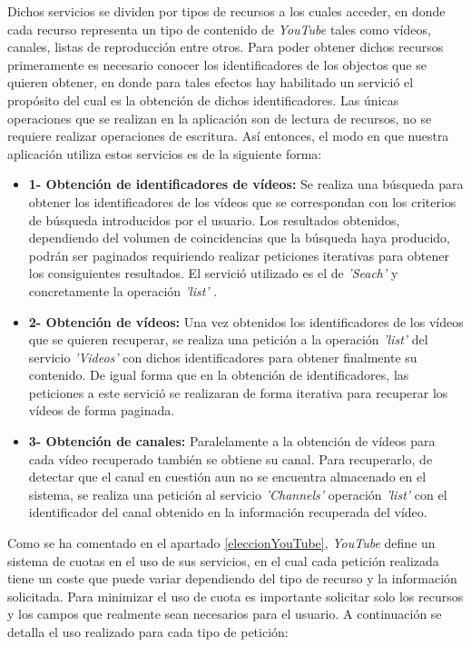 \documentclass[11pt,a4paper]{article}
\begin{document}
Dichos servicios se dividen por tipos de recursos a los cuales acceder, en donde cada recurso representa un tipo de contenido de \textit{YouTube} tales como vídeos, canales, listas de reproducción entre otros. Para poder obtener dichos recursos primeramente es necesario conocer los identificadores de los objectos que se quieren obtener, en donde para tales efectos hay habilitado un servició el propósito del cual es la obtención de dichos identificadores. Las únicas operaciones que se realizan en la aplicación son de lectura de recursos, no se requiere realizar operaciones de escritura. Así entonces, el modo en que nuestra aplicación utiliza estos servicios es de la siguiente forma:
\\
\begin{itemize}
\item \textbf{1- Obtención de identificadores de vídeos:} Se realiza una búsqueda para obtener los identificadores de los vídeos que se correspondan con los criterios de búsqueda introducidos por el usuario. Los resultados obtenidos, dependiendo del volumen de coincidencias que la búsqueda haya producido, podrán ser paginados requiriendo realizar peticiones iterativas para obtener los consiguientes resultados. El servició utilizado es el de \textit{'Seach'} y concretamente la operación \textit{'list'} \cite{30}.
\item \textbf{2- Obtención de vídeos:} Una vez obtenidos los identificadores de los vídeos que se quieren recuperar, se realiza una petición a la operación \textit{'list'} del servicio \textit{'Videos'} \cite{31} con dichos identificadores para obtener finalmente su contenido. De igual forma que en la obtención de identificadores, las peticiones a este servició se realizaran de forma iterativa para recuperar los vídeos de forma paginada.
\item \textbf{3- Obtención de canales:} Paralelamente a la obtención de vídeos para cada vídeo recuperado también se obtiene su canal. Para recuperarlo, de detectar que el canal en cuestión aun no se encuentra almacenado en el sistema, se realiza una petición al servicio \textit{'Channels'} operación \textit{'list'} \cite{32} con el identificador del canal obtenido en la información recuperada del vídeo.
\end{itemize}

Como se ha comentado en el apartado \ref{eleccionYouTube}, \textit{YouTube} define un sistema de cuotas en el uso de sus servicios, en el cual cada petición realizada tiene un coste que puede variar dependiendo del tipo de recurso y la información solicitada. Para minimizar el uso de cuota es importante solicitar solo los recursos y los campos que realmente sean necesarios para el usuario. A continuación se detalla el uso realizado para cada tipo de petición:
\\
\end{document}
